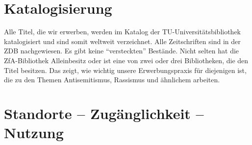 \documentclass[a4paper,
fontsize=11pt,
oneside,
numbers=noperiodatend,
parskip=half-,
bibliography=totoc,
final
]{scrartcl}
\begin{document}
\hypertarget{katalogisierung}{%
\section*{Katalogisierung}\label{katalogisierung}}

Alle Titel, die wir erwerben, werden im Katalog der
TU-Universitätsbibliothek katalogisiert und sind somit weltweit
verzeichnet. Alle Zeitschriften sind in der ZDB nachgewiesen. Es gibt
keine \enquote{versteckten} Bestände. Nicht selten hat die
ZfA-Bibliothek Alleinbesitz oder ist eine von zwei oder drei
Bibliotheken, die den Titel besitzen. Das zeigt, wie wichtig unsere
Erwerbungspraxis für diejenigen ist, die zu den Themen Antisemitismus,
Rassismus und ähnlichem arbeiten.

\hypertarget{standorte-zuguxe4nglichkeit-nutzung}{%
\section*{Standorte -- Zugänglichkeit --
Nutzung}\label{standorte-zuguxe4nglichkeit-nutzung}}
\end{document}
